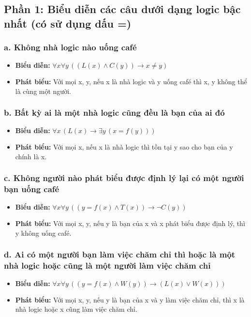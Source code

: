 \documentclass[12pt,a4paper]{article}
\begin{document}
\subsection{Phần 1: Biểu diễn các câu dưới dạng logic bậc nhất (có sử dụng dấu =)}

\subsubsection{a. Không nhà logic nào uống café}
\begin{itemize}
    \item \textbf{Biểu diễn:} $\forall x \forall y \, ((L(x) \land C(y)) \to x \neq y)$
    \item \textbf{Phát biểu:} Với mọi x, y, nếu x là nhà logic và y uống café thì x, y không thể là cùng một người.
\end{itemize}

\subsubsection{b. Bất kỳ ai là một nhà logic cũng đều là bạn của ai đó}
\begin{itemize}
    \item \textbf{Biểu diễn:} $\forall x \, (L(x) \to \exists y \, (x = f(y)))$
    \item \textbf{Phát biểu:} Với mọi x, nếu x là nhà logic thì tồn tại y sao cho bạn của y chính là x.
\end{itemize}

\subsubsection{c. Không người nào phát biểu được định lý lại có một người bạn uống café}
\begin{itemize}
    \item \textbf{Biểu diễn:} $\forall x \forall y \, ((y = f(x) \land T(x)) \to \neg C(y))$
    \item \textbf{Phát biểu:} Với mọi x, y, nếu y là bạn của x và x phát biểu được định lý, thì y không uống café.
\end{itemize}

\subsubsection{d. Ai có một người bạn làm việc chăm chỉ thì hoặc là một nhà logic hoặc cũng là một người làm việc chăm chỉ}
\begin{itemize}
    \item \textbf{Biểu diễn:} $\forall x \forall y \, ((y = f(x) \land W(y)) \to (L(x) \lor W(x)))$
    \item \textbf{Phát biểu:} Với mọi x, y, nếu y là bạn của x và y làm việc chăm chỉ, thì x là nhà logic hoặc x cũng làm việc chăm chỉ.
\end{itemize}
\end{document}

